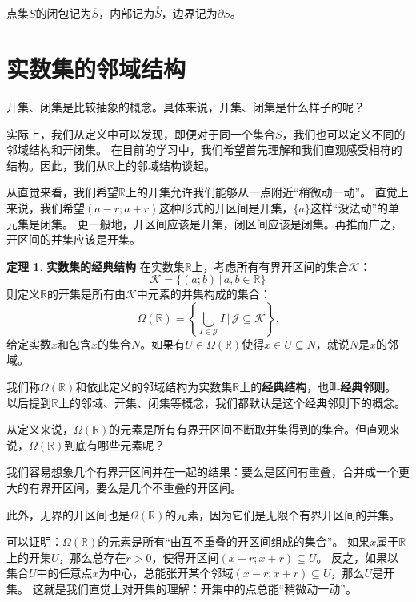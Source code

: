 \documentclass[12pt,UTF8]{ctexbook}
\theoremstyle{definition}
\newtheorem{tm}{定理}[section]
\theoremstyle{plain}
\begin{document}
点集$S$的闭包记为$\overline{S}$，内部记为$\overset{\circ}{S}$，边界记为$\partial S$。

\section{实数集的邻域结构}

开集、闭集是比较抽象的概念。具体来说，开集、闭集是什么样子的呢？

实际上，我们从定义中可以发现，即便对于同一个集合$S$，我们也可以定义不同的邻域结构和开闭集。
在目前的学习中，我们希望首先理解和我们直观感受相符的结构。因此，我们从$\mathbb{R}$上的邻域结构谈起。

从直觉来看，我们希望$\mathbb{R}$上的开集允许我们能够从一点附近“稍微动一动”。
直觉上来说，我们希望$(a-r;a+r)$这种形式的开区间是开集，$\{a\}$这样“没法动”的单元集是闭集。
更一般地，开区间应该是开集，闭区间应该是闭集。再推而广之，开区间的并集应该是开集。

\begin{tm}{\textbf{实数集的经典结构}}
    在实数集$\mathbb{R}$上，考虑所有有界开区间的集合$\mathcal{K}$：
    $$ \mathcal{K} = \{ (a;b) \, | \, a, b \in \mathbb{R} \}$$
    则定义$\mathbb{R}$的开集是所有由$\mathcal{K}$中元素的并集构成的集合：
    $$ \Omega(\mathbb{R}) = \left\{\bigcup_{I \in \mathcal{J}} I \, \Bigg| \,\mathcal{J} \subseteq  \mathcal{K} \right\}.$$
    给定实数$x$和包含$x$的集合$N$。如果有$U\in\Omega(\mathbb{R})$使得$x\in U\subseteq N$，就说$N$是$x$的邻域。

    我们称$\Omega(\mathbb{R})$和依此定义的邻域结构为实数集$\mathbb{R}$上的\textbf{经典结构}，也叫\textbf{经典邻则}。
    以后提到$\mathbb{R}$上的邻域、开集、闭集等概念，我们都默认是这个经典邻则下的概念。
\end{tm}

从定义来说，$\Omega(\mathbb{R})$的元素是所有有界开区间不断取并集得到的集合。但直观来说，$\Omega(\mathbb{R})$到底有哪些元素呢？

我们容易想象几个有界开区间并在一起的结果：要么是区间有重叠，合并成一个更大的有界开区间，要么是几个不重叠的开区间。

此外，无界的开区间也是$\Omega(\mathbb{R})$的元素，因为它们是无限个有界开区间的并集。

可以证明：$\Omega(\mathbb{R})$的元素是所有“由互不重叠的开区间组成的集合”。
如果$x$属于$\mathbb{R}$上的开集$U$，那么总存在$r>0$，使得开区间$(x-r;x+r)\subseteq U$。
反之，如果以集合$U$中的任意点$x$为中心，总能张开某个邻域$(x-r;x+r)\subseteq U$，那么$U$是开集。
这就是我们直觉上对开集的理解：开集中的点总能“稍微动一动”。
\end{document}
